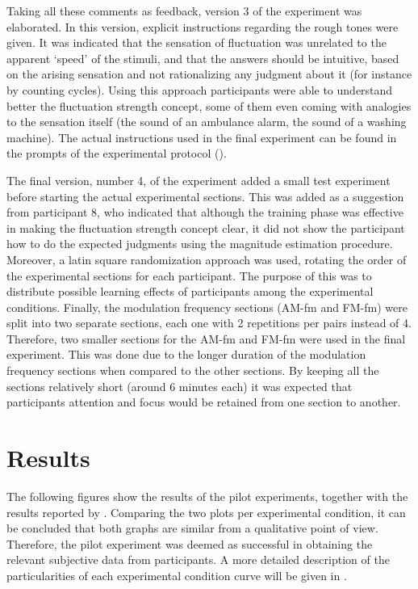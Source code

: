 \documentclass[../main.tex]{subfiles}
\begin{document}
Taking all these comments as feedback, version 3 of the experiment was
elaborated. In this version, explicit instructions regarding the rough tones
were given. It was indicated that the sensation of fluctuation was unrelated to
the apparent `speed' of the stimuli, and that the answers should be intuitive,
based on the arising sensation and not rationalizing any judgment about it
(for instance by counting cycles). Using this approach participants were able to
understand better the fluctuation strength concept, some of them even coming
with analogies to the sensation itself (the sound of an ambulance alarm, the
sound of a washing machine). The actual instructions used in the final
experiment can be found in the prompts of the experimental protocol
().

The final version, number 4, of the experiment added a small test experiment
before starting the actual experimental sections. This was added as a suggestion
from participant 8, who indicated that although the training phase was effective
in making the fluctuation strength concept clear, it did not show the
participant how to do the expected judgments using the magnitude estimation
procedure. Moreover, a latin square randomization approach was used, rotating
the order of the experimental sections for each participant. The purpose of this
was to distribute possible learning effects of participants among the
experimental conditions. Finally, the modulation frequency sections (AM-fm and
FM-fm) were split into two separate sections, each one with 2 repetitions per
pairs instead of 4. Therefore, two smaller sections for the AM-fm and FM-fm were
used in the final experiment. This was done due to the longer duration of the
modulation frequency sections when compared to the other sections. By keeping
all the sections relatively short (around 6 minutes each) it was expected that
participants attention and focus would be retained from one section to another.

\section{Results}

The following figures show the results of the pilot experiments, together with
the results reported by \textcite{Fastl2007Psychoacoustics}.  Comparing the two
plots per experimental condition, it can be concluded that both graphs are
similar from a qualitative point of view. Therefore, the pilot experiment was
deemed as successful in obtaining the relevant subjective data from
participants. A more detailed description of the particularities of each
experimental condition curve will be given in .
\end{document}
